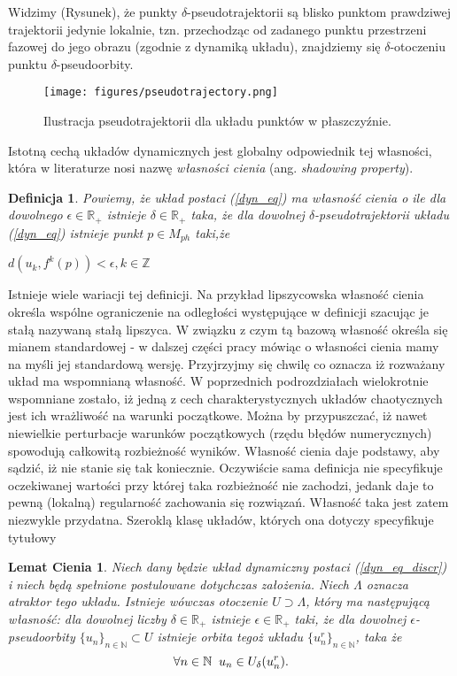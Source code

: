 \documentclass[12pt]{article}
\newtheorem{defi}{Definicja}
\newtheorem{lem}{Lemat Cienia}
\begin{document}
Widzimy (Rysunek), że punkty $\delta$-pseudotrajektorii są blisko punktom prawdziwej trajektorii jedynie lokalnie, tzn. przechodząc od zadanego punktu przestrzeni fazowej do jego obrazu (zgodnie z dynamiką układu), znajdziemy się $\delta$-otoczeniu punktu $\delta$-pseudoorbity. 
\begin{figure}[H]
	\texttt{[image: figures/pseudotrajectory.png]} 
	\centering
	\caption{Ilustracja pseudotrajektorii dla układu punktów w płaszczyźnie.}
\end{figure}
Istotną cechą układów dynamicznych jest globalny odpowiednik tej własności, która w literaturze nosi nazwę \textit{własności cienia} (ang. \textit{shadowing property}).
\begin{defi}\label{shadowing_property}
	Powiemy, że układ postaci (\ref{dyn_eq}) ma własność cienia o ile dla dowolnego $ \epsilon \in \mathbb{R}_{+} $ istnieje $ \delta \in \mathbb{R}_{+} $ taka, że dla dowolnej $\delta$-pseudotrajektorii układu (\ref{dyn_eq}) istnieje punkt $ p \in M_{ph} $ taki,że
	\begin{center}
		$ d(u_{k}, f^{k}(p)) < \epsilon, k \in \mathbb{Z}$
	\end{center}
\end{defi}
Istnieje wiele wariacji tej definicji. Na przykład lipszycowska własność cienia określa wspólne ograniczenie na odległości występujące w definicji szacując je stałą nazywaną stałą lipszyca. W związku z czym tą bazową własność określa się mianem standardowej - w dalszej części pracy mówiąc o własności cienia mamy na myśli jej standardową wersję.\newline
Przyjrzyjmy się chwilę co oznacza iż rozważany układ ma wspomnianą własność. W poprzednich podrozdziałach wielokrotnie wspomniane zostało, iż jedną z cech charakterystycznych układów chaotycznych jest ich wrażliwość na warunki początkowe. Można by przypuszczać, iż nawet niewielkie perturbacje warunków początkowych (rzędu błędów numerycznych) spowodują całkowitą rozbieżność wyników. Własność cienia daje podstawy, aby sądzić, iż nie stanie się tak koniecznie. Oczywiście sama definicja nie specyfikuje oczekiwanej wartości przy której taka rozbieżność nie zachodzi, jedank daje to pewną (lokalną) regularność zachowania się rozwiązań. Własność taka jest zatem niezwykle przydatna. Szeroklą klasę układów, których ona dotyczy specyfikuje tytułowy
\begin{lem}
Niech dany będzie układ dynamiczny postaci (\ref{dyn_eq_discr}) i niech będą spełnione postulowane dotychczas założenia. Niech $\Lambda$ oznacza atraktor tego układu. Istnieje wówczas otoczenie $ U \supset \Lambda $, który ma następującą własność: dla dowolnej liczby $\delta \in \mathbb{R}_{+}$ istnieje $\epsilon \in \mathbb{R}_{+}$  taki, że dla dowolnej $\epsilon$-pseudoorbity $ \{u_{n}\}_{n \in \mathbb{N}} \subset U $ istnieje orbita tegoż układu $ \{u^{r}_{n}\}_{n \in \mathbb{N}} $, taka że
\begin{equation}
\forall{n \in \mathbb{N}} \thickspace \thickspace u_{n} \in U_{\delta}(u^{r}_{n}).
\end{equation}
\end{lem}
\end{document}
